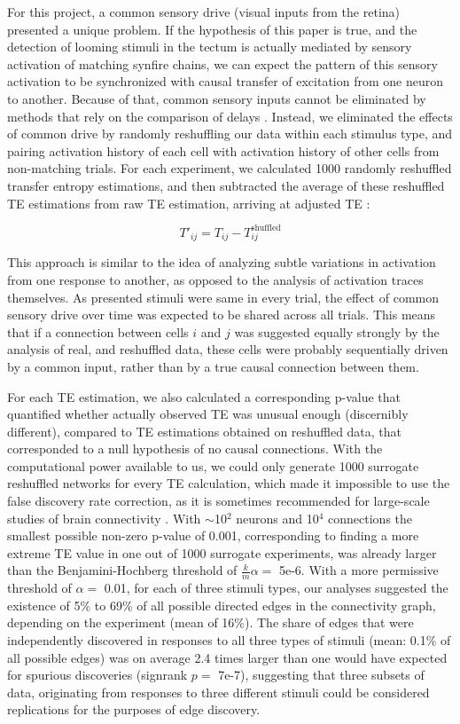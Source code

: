 \documentclass{article}
\begin{document}
For this project, a common sensory drive (visual inputs from the retina) presented a unique problem. If the hypothesis of this paper is true, and the detection of looming stimuli in the tectum is actually mediated by sensory activation of matching synfire chains, we can expect the pattern of this sensory activation to be synchronized with causal transfer of excitation from one neuron to another. Because of that, common sensory inputs cannot be eliminated by methods that rely on the comparison of delays \citep{wollstadt2014te}. Instead, we eliminated the effects of common drive by randomly reshuffling our data within each stimulus type, and pairing activation history of each cell with activation history of other cells from non-matching trials. For each experiment, we calculated 1000 randomly reshuffled transfer entropy estimations, and then subtracted the average of these reshuffled TE estimations from raw TE estimation, arriving at adjusted TE \citep{gourevitch2007te}:

\[ T'_{ij} = T_{ij} - T^\text{shuffled}_{ij} \]

This approach is similar to the idea of analyzing subtle variations in activation from one response to another, as opposed to the analysis of activation traces themselves. As presented stimuli were same in every trial, the effect of common sensory drive over time was expected to be shared across all trials. This means that if a connection between cells $i$ and $j$ was suggested equally strongly by the analysis of real, and reshuffled data, these cells were probably sequentially driven by a common input, rather than by a true causal connection between them.

For each TE estimation, we also calculated a corresponding p-value that quantified whether actually observed TE was unusual enough (discernibly different), compared to TE estimations obtained on reshuffled data, that corresponded to a null hypothesis of no causal connections. With the computational power available to us, we could only generate 1000 surrogate reshuffled networks for every TE calculation, which made it impossible to use the false discovery rate correction, as it is sometimes recommended for large-scale studies of brain connectivity \citep{lindner2011trentool, vicente2011te}. With $\sim$10$^2$ neurons and 10$^4$ connections the smallest possible non-zero p-value of 0.001, corresponding to finding a more extreme TE value in one out of 1000 surrogate experiments, was already larger than the Benjamini-Hochberg threshold of $\frac{k}{m}\alpha=$ 5e-6. With a more permissive threshold of $\alpha=$ 0.01, for each of three stimuli types, our analyses suggested the existence of 5\% to 69\% of all possible directed edges in the connectivity graph, depending on the experiment (mean of 16\%). The share of edges that were independently discovered in responses to all three types of stimuli  (mean: 0.1\% of all possible edges) was on average 2.4 times larger than one would have expected for spurious discoveries (signrank $p=$ 7e-7), suggesting that three subsets of data, originating from responses to three different stimuli could be considered replications for the purposes of edge discovery. 
\end{document}
